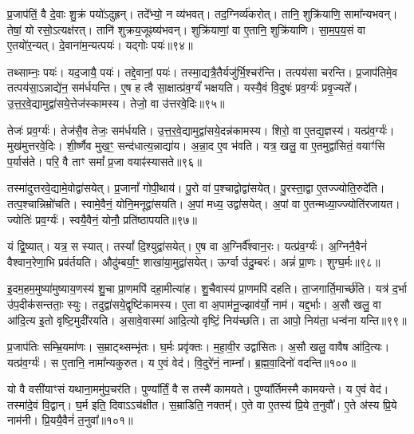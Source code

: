 प्र॒जाप॑तिं॒ वै दे॒वाः  शु॒क्रं पयो॑ऽदुह्रन्। 
तदे᳚भ्यो॒ न व्य॑भवत्। 
तद॒ग्निर्व्य॑करोत्। 
तानि॒ शुक्रि॑याणि॒ सामा᳚न्यभवन्। 
तेषां॒ यो रसो॒ऽत्यक्ष॑रत्। 
तानि॑ शुक्रय॒जूꣴष्य॑भवन्। 
शुक्रि॑याणां॒ वा ए॒तानि॒ शुक्रि॑याणि। 
सा॒म॒प॒य॒सं वा ए॒तयो॑र॒न्यत्। 
दे॒वाना॑म॒न्यत्पयः॑। 
यद्गोः पयः॑॥९४॥

तथ्साम्नः॒ पयः॑। 
यद॒जायै॒ पयः॑। 
तद्दे॒वानां॒ पयः॑। 
तस्मा॒द्यत्रै॒तैर्यजु॑र्भि॒\-श्चर॑न्ति। 
तत्पय॑सा चरन्ति। 
प्र॒जाप॑तिमे॒व तत्पय॑सा॒ऽन्नाद्ये॑न॒ सम॑र्धयन्ति। 
ए॒ष ह त्वै सा॒क्षात्प्र॑व॒र्ग्यं॑ भक्षयति। 
यस्यै॒वं  वि॒दुषः॑ प्रव॒र्ग्यः॑ प्रवृ॒ज्यते᳚। 
उ॒त्त॒र॒वे॒द्यामुद्वा॑स\-ये॒त्तेज॑स्कामस्य। 
तेजो॒ वा उ॑त्तरवे॒दिः॥९५॥

तेजः॑ प्रव॒र्ग्यः॑। 
तेज॑सै॒व तेजः॒ सम॑र्धयति। 
उ॒त्त॒र॒वे॒द्यामुद्वा॑सये॒\-दन्न॑\-कामस्य। 
शिरो॒ वा ए॒तद्य॒ज्ञस्य॑। 
यत्प्र॑व॒र्ग्यः॑। 
मुख॑मुत्तरवे॒दिः। 
शी॒र्ष्णैव मुख॒ꣳ॒ सन्द॑धात्य॒न्नाद्या॑य। 
अ॒न्ना॒द ए॒व भ॑वति। 
यत्र॒ खलु॒ वा ए॒तमुद्वा॑सितं॒ वयाꣳ॑सि प॒र्यास॑ते। 
परि॒ वै ताꣳ समां᳚ प्र॒जा वयाꣴ॑स्यासते॥९६॥

तस्मा॑दुत्तरवे॒द्यामे॒वोद्वा॑सयेत्। 
प्र॒जानां᳚ गोपी॒थाय॑। 
पु॒रो वा॑ प॒श्चाद्वोद्वा॑सयेत्। 
पु॒रस्ता॒द्वा ए॒तज्ज्योति॒रुदे॑ति। 
तत्प॒श्चान्निम्रो॑चति। 
स्वामे॒वैनं॒ योनि॒मनूद्वा॑सयति। 
अ॒पां मध्य॒ उद्वा॑सयेत्। 
अ॒पां वा ए॒तन्मध्या॒ज्ज्योति॑रजायत। 
ज्योतिः॑ प्रव॒र्ग्यः॑। 
स्वयै॒वैनं॒ योनौ॒ प्रति॑ष्ठापयति॥९७॥

यं द्वि॒ष्यात्। 
यत्र॒ स स्यात्। 
तस्यां᳚ दि॒श्युद्वा॑सयेत्। 
ए॒ष वा अ॒ग्निर्वै᳚श्वान॒रः। 
यत्प्र॑व॒र्ग्यः॑। 
अ॒ग्निनै॒वैनं॑ वैश्वान॒रेणा॒भि प्रव॑र्तयति। 
औदु॑म्बर्या॒ꣳ॒ शाखा॑या॒मुद्वा॑सयेत्। 
ऊर्ग्वा उ॑दु॒म्बरः॑। 
अन्नं॑ प्रा॒णः। 
शुग्घ॒र्मः॥९८॥

इ॒दम॒हम॒मुष्या॑मुष्याय॒णस्य॑ शु॒चा प्रा॒णमपि॑ दहा॒मीत्या॑ह। 
शु॒चैवास्य॑ प्रा॒णमपि॑ दहति। 
ता॒जगार्ति॒मार्च्छ॑ति। 
यत्र॑ द॒र्भा उ॑प॒दीक॑सन्तताः॒ स्युः। 
तदुद्वा॑सये॒द्वृष्टि॑कामस्य। 
ए॒ता वा अ॒पाम॑नू॒ज्झाव॑र्यो॒ नाम॑। 
यद्द॒र्भाः। 
अ॒सौ खलु॒ वा आ॑दि॒त्य इ॒तो वृष्टि॒मुदी॑रयति। 
अ॒सावे॒वास्मा॑ आदि॒त्यो वृष्टिं॒ निय॑च्छति। 
ता आपो॒ निय॑ता॒ धन्व॑ना यन्ति॥९९॥

प्र॒जाप॑तिः सम्भ्रि॒यमा॑णः। 
स॒म्राट्थ्सम्भृ॑तः। 
घ॒र्मः प्रवृ॑क्तः। 
म॒हा॒वी॒र उद्वा॑सितः। 
अ॒सौ खलु॒ वावैष आ॑दि॒त्यः। 
यत्प्र॑व॒र्ग्यः॑। 
स ए॒तानि॒ नामा᳚न्यकुरुत। 
य ए॒वं वेद॑। 
वि॒दुरे॑नं॒ नाम्ना᳚। 
ब्र॒ह्म॒वा॒दिनो॑ वदन्ति॥१००॥

यो वै वसी॑याꣳसं यथाना॒ममु॑प॒चर॑ति। 
पुण्या᳚र्तिं॒ वै स तस्मै॑ कामयते। 
पुण्या᳚र्तिमस्मै कामयन्ते। 
य ए॒वं वेद॑। 
तस्मा॑दे॒वं  वि॒द्वान्। 
घ॒र्म इति॒ दिवाऽऽच॑क्षीत। 
स॒म्राडिति॒ नक्तम्᳚। 
ए॒ते वा ए॒तस्य॑ प्रि॒ये त॒नुवौ᳚। 
ए॒ते अ॑स्य प्रि॒ये नाम॑नी। 
प्रि॒ययै॒वैनं॑ त॒नुवा᳚॥१०१॥

